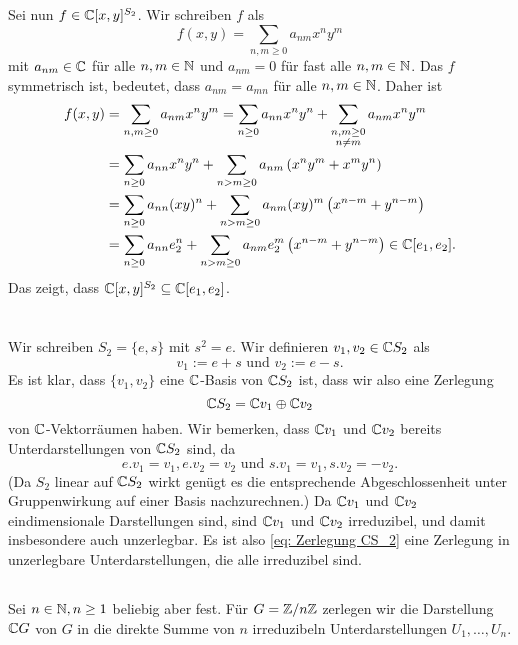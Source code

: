 \documentclass[a4paper,10pt]{article}
\begin{document}
Sei nun $f \in \mathbb{C}[x,y]^{S_2}$. Wir schreiben $f$ als
\[
 f(x,y) = \sum_{n,m \geq 0} a_{nm} x^n y^m
\]
mit $a_{nm} \in \mathbb{C}$ für alle $n,m \in \mathbb{N}$ und $a_{nm} = 0$ für fast alle $n,m \in \mathbb{N}$. Das $f$ symmetrisch ist, bedeutet, dass $a_{nm} = a_{mn}$ für alle $n,m \in \mathbb{N}$. Daher ist
\begin{align*}
 f(x,y)
 &= \sum_{n,m \geq 0} a_{nm} x^n y^m
 = \sum_{n \geq 0} a_{nn} x^n y^n + \sum_{\substack{n,m \geq 0 \\ n \neq m}} a_{nm} x^n y^m \\
 &= \sum_{n \geq 0} a_{nn} x^n y^n + \sum_{n > m \geq 0} a_{nm}\left(x^n y^m + x^m y^n\right) \\
 &= \sum_{n \geq 0} a_{nn} (xy)^n + \sum_{n > m \geq 0} a_{nm} (xy)^m \left(x^{n-m} + y^{n-m}\right) \\
 &= \sum_{n \geq 0} a_{nn} e_2^n + \sum_{n > m \geq 0} a_{nm} e_2^m \left(x^{n-m} + y^{n-m}\right)
 \in \mathbb{C}[e_1, e_2].
\end{align*}
Das zeigt, dass $\mathbb{C}[x,y]^{S_2} \subseteq \mathbb{C}[e_1, e_2]$.




\section{}


\subsection{}
Wir schreiben $S_2 = \{e,s\}$ mit $s^2 = e$. Wir definieren $v_1, v_2 \in \mathbb{C} S_2$ als
\[
 v_1 := e+s \text{ und } v_2 := e - s.
\]
Es ist klar, dass $\{v_1, v_2\}$ eine $\mathbb{C}$-Basis von $\mathbb{C} S_2$ ist, dass wir also eine Zerlegung
\begin{equation}\label{eq: Zerlegung CS_2}
 \mathbb{C} S_2 = \mathbb{C} v_1 \oplus \mathbb{C} v_2
\end{equation}
von $\mathbb{C}$-Vektorräumen haben. Wir bemerken, dass $\mathbb{C} v_1$ und $\mathbb{C} v_2$ bereits Unterdarstellungen von $\mathbb{C} S_2$ sind, da
\[
 e.v_1 = v_1, e.v_2 = v_2 \text{ und } s.v_1 = v_1, s.v_2 = -v_2.
\]
(Da $S_2$ linear auf $\mathbb{C} S_2$ wirkt genügt es die entsprechende Abgeschlossenheit unter Gruppenwirkung auf einer Basis nachzurechnen.) Da $\mathbb{C} v_1$ und $\mathbb{C} v_2$ eindimensionale Darstellungen sind, sind $\mathbb{C} v_1$ und $\mathbb{C} v_2$ irreduzibel, und damit insbesondere auch unzerlegbar. Es ist also \eqref{eq: Zerlegung CS_2} eine Zerlegung in unzerlegbare Unterdarstellungen, die alle irreduzibel sind.


\subsection{}
Sei $n \in \mathbb{N}, n \geq 1$ beliebig aber fest. Für $G = \mathbb{Z}/n\mathbb{Z}$ zerlegen wir die Darstellung $\mathbb{C} G$ von $G$ in die direkte Summe von $n$ irreduzibeln Unterdarstellungen $U_1, \ldots, U_n$.
\end{document}
